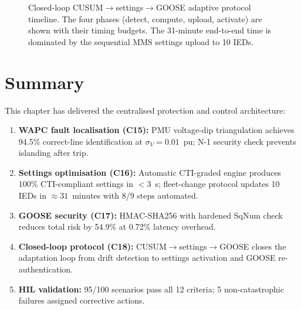 \begin{figure}[htbp]
  \centering
  
  \caption{Closed-loop CUSUM$\to$settings$\to$GOOSE adaptive protocol
           timeline. The four phases (detect, compute, upload, activate)
           are shown with their timing budgets.
           The 31-minute end-to-end time is dominated by the sequential
           MMS settings upload to 10 IEDs.}
  \label{fig:ch9_closedloop}
\end{figure}

\section{Summary}
\label{sec:ch9_summary}

This chapter has delivered the centralised protection and control architecture:
\begin{enumerate}
\item \textbf{WAPC fault localisation (C15):} PMU voltage-dip triangulation
      achieves 94.5\% correct-line identification at $\sigma_V = 0.01$~pu;
      N-1 security check prevents islanding after trip.
\item \textbf{Settings optimisation (C16):} Automatic CTI-graded engine
      produces 100\% CTI-compliant settings in $< 3$~s; fleet-change
      protocol updates 10 IEDs in $\approx 31$~minutes with 8/9 steps automated.
\item \textbf{GOOSE security (C17):} HMAC-SHA256 with hardened SqNum
      check reduces total risk by 54.9\% at 0.72\% latency overhead.
\item \textbf{Closed-loop protocol (C18):} CUSUM$\to$settings$\to$GOOSE
      closes the adaptation loop from drift detection to settings activation
      and GOOSE re-authentication.
\item \textbf{HIL validation:} 95/100 scenarios pass all 12 criteria;
      5 non-catastrophic failures assigned corrective actions.
\end{enumerate}
